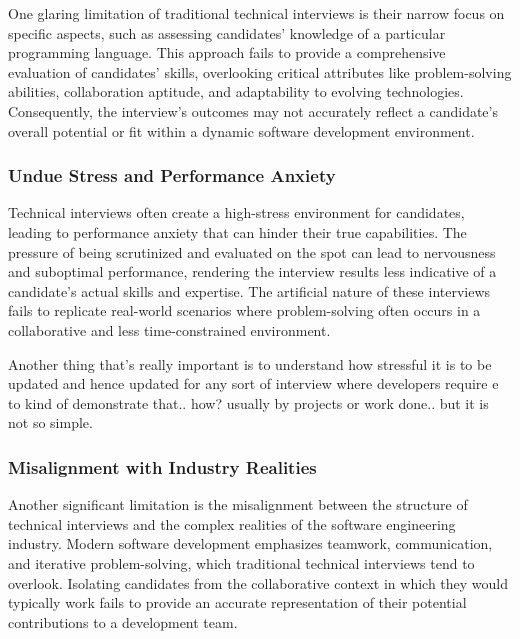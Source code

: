 \documentclass[
    a4paper, %
    10pt, %
    unnumberedsections, %
    twoside, %
]{LTJournalArticle}
\begin{document}
One glaring limitation of traditional technical interviews is their narrow focus on specific aspects, such as assessing candidates' knowledge of a particular programming language. This approach fails to provide a comprehensive evaluation of candidates' skills, overlooking critical attributes like problem-solving abilities, collaboration aptitude, and adaptability to evolving technologies. Consequently, the interview's outcomes may not accurately reflect a candidate's overall potential or fit within a dynamic software development environment.

\subsubsection*{Undue Stress and Performance Anxiety}

Technical interviews often create a high-stress environment for candidates, leading to performance anxiety that can hinder their true capabilities. The pressure of being scrutinized and evaluated on the spot can lead to nervousness and suboptimal performance, rendering the interview results less indicative of a candidate's actual skills and expertise. The artificial nature of these interviews fails to replicate real-world scenarios where problem-solving often occurs in a collaborative and less time-constrained environment.



Another thing that's really important is to understand how stressful it is to be updated and hence updated for any sort of interview where developers require e to kind of demonstrate that.. how? usually by projects or work done.. but it is not so simple.  


\subsubsection*{Misalignment with Industry Realities}

Another significant limitation is the misalignment between the structure of technical interviews and the complex realities of the software engineering industry. Modern software development emphasizes teamwork, communication, and iterative problem-solving, which traditional technical interviews tend to overlook. Isolating candidates from the collaborative context in which they would typically work fails to provide an accurate representation of their potential contributions to a development team.
\end{document}
